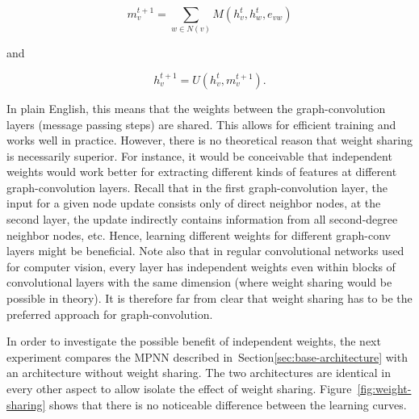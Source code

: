 \begin{equation}
m_v^{t+1} = \sum_{w \in N(v)} M(h_v^t, h_w^t, e_{vw})
\end{equation}
\label{eq:message-function-shared}

and

\begin{equation}
h_v^{t+1} = U(h_v^t, m_v^{t+1}).
\end{equation}
\label{eq:update-function-shared}


In plain English, this means that the weights between the graph-convolution layers (message passing steps) are shared. This allows for efficient training and works well in practice. However, there is no theoretical reason that weight sharing is necessarily superior. For instance, it would be conceivable that independent weights would work better for extracting different kinds of features at different graph-convolution layers. Recall that in the first graph-convolution layer, the input for a given node update consists only of direct neighbor nodes, at the second layer, the update indirectly contains information from all second-degree neighbor nodes, etc. Hence, learning different weights for different graph-conv layers might be beneficial. Note also that in regular convolutional networks used for computer vision, every layer has independent weights even within blocks of convolutional layers with the same dimension (where weight sharing would be possible in theory). It is therefore far from clear that weight sharing has to be the preferred approach for graph-convolution.

In order to investigate the possible benefit of independent weights, the next experiment compares the MPNN described in~Section\ref{sec:base-architecture} with an architecture without weight sharing. The two architectures are identical in every other aspect to allow isolate the effect of weight sharing. Figure~\ref{fig:weight-sharing} shows that there is no noticeable difference between the learning curves.


